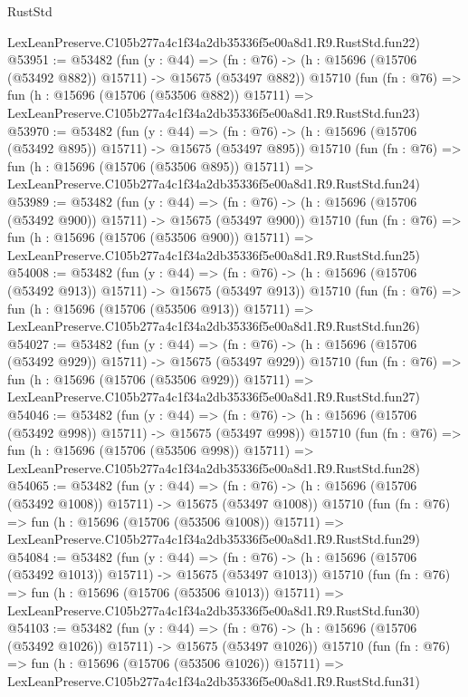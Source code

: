 \begin{lexlean}{RustStd}
\begin{coremodule}
    LexLeanPreserve.C105b277a4c1f34a2db35336f5e00a8d1.R9.RustStd.fun22)
@53951 := @53482
    (fun (y : @44) =>
    (fn : @76) -> (h : @15696 (@15706 (@53492 @882)) @15711) -> @15675 (@53497 @882))
    @15710
    (fun (fn : @76) =>
    fun (h : @15696 (@15706 (@53506 @882)) @15711) =>
    LexLeanPreserve.C105b277a4c1f34a2db35336f5e00a8d1.R9.RustStd.fun23)
@53970 := @53482
    (fun (y : @44) =>
    (fn : @76) -> (h : @15696 (@15706 (@53492 @895)) @15711) -> @15675 (@53497 @895))
    @15710
    (fun (fn : @76) =>
    fun (h : @15696 (@15706 (@53506 @895)) @15711) =>
    LexLeanPreserve.C105b277a4c1f34a2db35336f5e00a8d1.R9.RustStd.fun24)
@53989 := @53482
    (fun (y : @44) =>
    (fn : @76) -> (h : @15696 (@15706 (@53492 @900)) @15711) -> @15675 (@53497 @900))
    @15710
    (fun (fn : @76) =>
    fun (h : @15696 (@15706 (@53506 @900)) @15711) =>
    LexLeanPreserve.C105b277a4c1f34a2db35336f5e00a8d1.R9.RustStd.fun25)
@54008 := @53482
    (fun (y : @44) =>
    (fn : @76) -> (h : @15696 (@15706 (@53492 @913)) @15711) -> @15675 (@53497 @913))
    @15710
    (fun (fn : @76) =>
    fun (h : @15696 (@15706 (@53506 @913)) @15711) =>
    LexLeanPreserve.C105b277a4c1f34a2db35336f5e00a8d1.R9.RustStd.fun26)
@54027 := @53482
    (fun (y : @44) =>
    (fn : @76) -> (h : @15696 (@15706 (@53492 @929)) @15711) -> @15675 (@53497 @929))
    @15710
    (fun (fn : @76) =>
    fun (h : @15696 (@15706 (@53506 @929)) @15711) =>
    LexLeanPreserve.C105b277a4c1f34a2db35336f5e00a8d1.R9.RustStd.fun27)
@54046 := @53482
    (fun (y : @44) =>
    (fn : @76) -> (h : @15696 (@15706 (@53492 @998)) @15711) -> @15675 (@53497 @998))
    @15710
    (fun (fn : @76) =>
    fun (h : @15696 (@15706 (@53506 @998)) @15711) =>
    LexLeanPreserve.C105b277a4c1f34a2db35336f5e00a8d1.R9.RustStd.fun28)
@54065 := @53482
    (fun (y : @44) =>
    (fn : @76) -> (h : @15696 (@15706 (@53492 @1008)) @15711) -> @15675 (@53497 @1008))
    @15710
    (fun (fn : @76) =>
    fun (h : @15696 (@15706 (@53506 @1008)) @15711) =>
    LexLeanPreserve.C105b277a4c1f34a2db35336f5e00a8d1.R9.RustStd.fun29)
@54084 := @53482
    (fun (y : @44) =>
    (fn : @76) -> (h : @15696 (@15706 (@53492 @1013)) @15711) -> @15675 (@53497 @1013))
    @15710
    (fun (fn : @76) =>
    fun (h : @15696 (@15706 (@53506 @1013)) @15711) =>
    LexLeanPreserve.C105b277a4c1f34a2db35336f5e00a8d1.R9.RustStd.fun30)
@54103 := @53482
    (fun (y : @44) =>
    (fn : @76) -> (h : @15696 (@15706 (@53492 @1026)) @15711) -> @15675 (@53497 @1026))
    @15710
    (fun (fn : @76) =>
    fun (h : @15696 (@15706 (@53506 @1026)) @15711) =>
    LexLeanPreserve.C105b277a4c1f34a2db35336f5e00a8d1.R9.RustStd.fun31)

\end{coremodule}
\end{lexlean}
